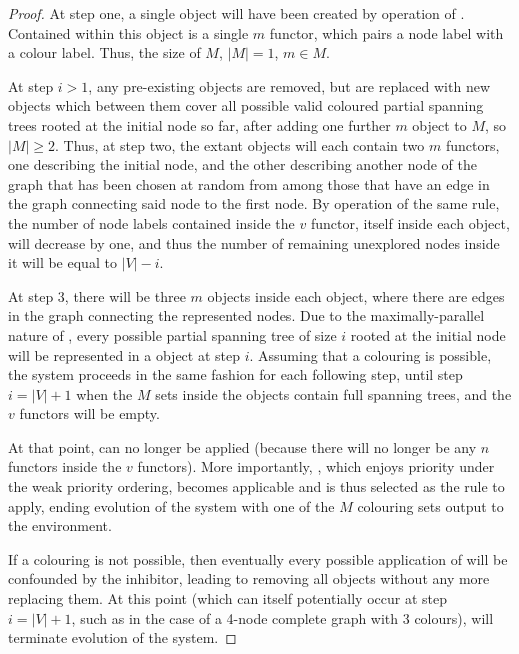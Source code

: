 \begin{proof}

At step one, a single \bo{} object will have been created by operation of .  Contained within this \bo{} object is a single \(m\) functor, which pairs a node label with a colour label.  Thus, the size of \(M\), \(|M| = 1\), \(m \in M\).

At step \(i > 1\), any pre-existing \bo{} objects are removed, but are replaced with new \bo{} objects which between them cover all possible valid coloured partial spanning trees rooted at the initial node so far, after adding one further \(m\) object to \(M\), so \(|M| \geq 2\).  Thus, at step two, the extant \bo{} objects will each contain two \(m\) functors, one describing the initial node, and the other describing another node of the graph that has been chosen at random from among those that have an edge in the graph connecting said node to the first node.  By operation of the same rule, the number of node labels contained inside the \(v\) functor, itself inside each \bo{} object, will decrease by one, and thus the number of remaining unexplored nodes inside it will be equal to \(|V| - i\).

At step 3, there will be three \(m\) objects inside each \bo{} object, where there are edges in the graph connecting the represented nodes.  Due to the maximally-parallel nature of , every possible partial spanning tree of size \(i\) rooted at the initial node will be represented in a \bo{} object at step \(i\).  Assuming that a colouring is possible, the system proceeds in the same fashion for each following step, until step \(i = |V| + 1\) when the \(M\) sets inside the \bo{} objects contain full spanning trees, and the \(v\) functors will be empty.

At that point,  can no longer be applied (because there will no longer be any \(n\) functors inside the \(v\) functors).  More importantly, , which enjoys priority under the weak priority ordering, becomes applicable and is thus selected as the rule to apply, ending evolution of the system with one of the \(M\) colouring sets output to the environment.

If a colouring is not possible, then eventually every possible application of  will be confounded by the inhibitor, leading to  removing all \bo{} objects without any more replacing them.  At this point (which can itself potentially occur at step \(i = |V| + 1\), such as in the case of a 4-node complete graph with 3 colours),  will terminate evolution of the system.
\end{proof}

